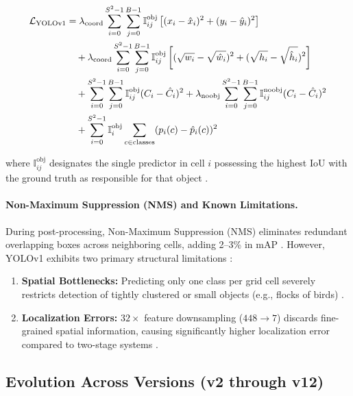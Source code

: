\begin{align}
\mathcal{L}_{\text{YOLOv1}} &= \lambda_{\text{coord}} \sum_{i=0}^{S^2-1} \sum_{j=0}^{B-1} \mathbb{I}_{ij}^{\text{obj}} \left[ (x_i - \hat{x}_i)^2 + (y_i - \hat{y}_i)^2 \right] \notag \\
&\quad + \lambda_{\text{coord}} \sum_{i=0}^{S^2-1} \sum_{j=0}^{B-1} \mathbb{I}_{ij}^{\text{obj}} \left[ (\sqrt{w_i} - \sqrt{\hat{w}_i})^2 + (\sqrt{h_i} - \sqrt{\hat{h}_i})^2 \right] \notag \\
&\quad + \sum_{i=0}^{S^2-1} \sum_{j=0}^{B-1} \mathbb{I}_{ij}^{\text{obj}} (C_i - \hat{C}_i)^2 + \lambda_{\text{noobj}} \sum_{i=0}^{S^2-1} \sum_{j=0}^{B-1} \mathbb{I}_{ij}^{\text{noobj}} (C_i - \hat{C}_i)^2 \notag \\
&\quad + \sum_{i=0}^{S^2-1} \mathbb{I}_i^{\text{obj}} \sum_{c \in \text{classes}} (p_i(c) - \hat{p}_i(c))^2
\label{eq:yolov1-loss}
\end{align}

where $\mathbb{I}_{ij}^{\text{obj}}$ designates the single predictor in cell $i$ possessing the highest IoU with the ground truth as responsible for that object \parencite{redmon_you_2016}.

\paragraph{Non-Maximum Suppression (NMS) and Known Limitations.}
During post-processing, Non-Maximum Suppression (NMS) eliminates redundant overlapping boxes across neighboring cells, adding 2--3\% in mAP \parencite{redmon_you_2016, ramos_yoloreview}. However, YOLOv1 exhibits two primary structural limitations \parencite{redmon_you_2016}:

\begin{enumerate}
    \item \textbf{Spatial Bottlenecks:} Predicting only one class per grid cell severely restricts detection of tightly clustered or small objects (e.g., flocks of birds) \parencite{redmon_you_2016, ramos_yoloreview}.
    \item \textbf{Localization Errors:} $32\times$ feature downsampling ($448 \to 7$) discards fine-grained spatial information, causing significantly higher localization error compared to two-stage systems \parencite{redmon_you_2016, ramos_yoloreview}.
\end{enumerate}

\subsection{Evolution Across Versions (v2 through v12)}

